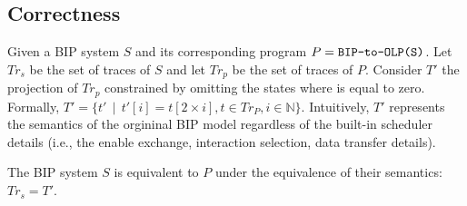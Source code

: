\subsection{Correctness}
Given a BIP system $S$ and its corresponding \caig program $P = \texttt{BIP-to-OLP(S)}$. 
Let $Tr_s$ be the set of traces of $S$ and let $Tr_p$ be the set of traces of $P$. 
Consider $T'$ the projection of $Tr_p$ constrained by omitting the states where  is equal to zero. 
Formally, $T'  = \{t' \,\mid\, t'[i] = t[2\times i], t \in Tr_P, i \in \mathbb{N}\}$. 
Intuitively, $T'$ represents the semantics of the orgininal BIP model regardless of the built-in scheduler details 
(i.e., the enable exchange, interaction selection, data transfer details). 

\begin{theorem}
\label{theorem:correct}
The BIP system $S$ is equivalent to $P$ under the equivalence of their semantics: $Tr_s=T'$.  
\end{theorem}
